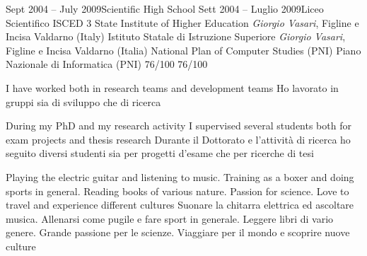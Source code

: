\begin{europasscv}
      \addSchool
      {Sept 2004 -- July 2009}{Scientific High School}
      {Sett 2004 -- Luglio 2009}{Liceo Scientifico}
      {ISCED 3}
        \addItem
          {State Institute of Higher Education \textit{Giorgio Vasari}, Figline e Incisa Valdarno (Italy)}
          {Istituto Statale di Istruzione Superiore \textit{Giorgio Vasari}, Figline e Incisa Valdarno (Italia)}
        \addItem
          {National Plan of Computer Studies (PNI)}
          {Piano Nazionale di Informatica (PNI)}
        \addFinalRank
          {76/100}
          {76/100}
    
    \personalSkills
    
      
      \communicationSkills
        {I have worked both in research teams and development teams}
        {Ho lavorato in gruppi sia di sviluppo che di ricerca}
      
      \organisationalSkills
        {During my PhD and my research activity I supervised several students both for exam projects and thesis research}
        {Durante il Dottorato e l'attività di ricerca ho seguito diversi studenti sia per progetti d'esame che per ricerche di tesi}
        
      \computerSkills
        {}
        {}
        
      \otherSkills
        {Playing the electric guitar and listening to music. Training as a boxer and doing sports in general. Reading books of various nature. Passion for science. Love to travel and experience different cultures}
        {Suonare la chitarra elettrica ed ascoltare musica. Allenarsi come pugile e fare sport in generale. Leggere libri di vario genere. Grande passione per le scienze. Viaggiare per il mondo e scoprire nuove culture}
        

\end{europasscv}
